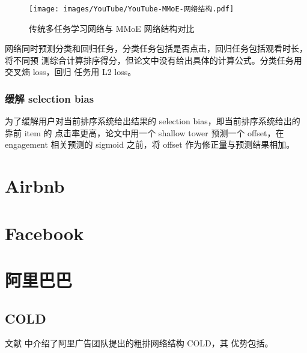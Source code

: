 \begin{figure}[ht]
  \centering
  \texttt{[image: images/YouTube/YouTube-MMoE-网络结构.pdf]}
  \caption{传统多任务学习网络与 MMoE 网络结构对比}\label{fig:mmoe-structure}
\end{figure}

网络同时预测分类和回归任务，分类任务包括是否点击，回归任务包括观看时长，将不同预
测综合计算排序得分，但论文中没有给出具体的计算公式。分类任务用交叉熵 loss，回归
任务用 L2 loss。

\subsubsection{缓解 selection bias}
为了缓解用户对当前排序系统给出结果的 selection bias，即当前排序系统给出的靠前 item 的
点击率更高，论文中用一个 shallow tower 预测一个 offset，在 engagement 相关预测的
sigmoid 之前，将 offset 作为修正量与预测结果相加。

\section{Airbnb}

\section{Facebook}

\section{阿里巴巴}
\subsection{COLD}
文献  中介绍了阿里广告团队提出的粗排网络结构 COLD，其
优势包括。

